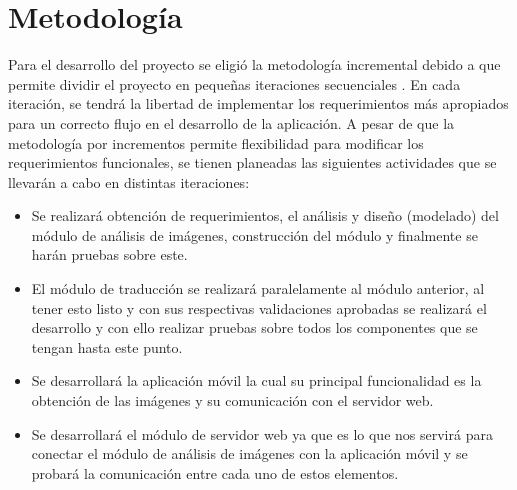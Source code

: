 \section{Metodología} Para el desarrollo del proyecto se eligió la metodología incremental debido a que permite dividir el proyecto en pequeñas iteraciones secuenciales \cite{iterativeDevelopment}. En cada iteración, se tendrá la libertad de implementar los requerimientos más apropiados para un correcto flujo en el desarrollo de la aplicación. A pesar de que la metodología por incrementos permite flexibilidad para modificar los requerimientos funcionales, se tienen planeadas las siguientes actividades que se llevarán a cabo en distintas iteraciones:
\bigskip
\begin{itemize}
    \item Se realizará obtención de requerimientos, el análisis y diseño (modelado) del módulo de análisis de imágenes, construcción del módulo y finalmente se harán pruebas sobre este.
    \item El módulo de traducción se realizará paralelamente al módulo anterior, al tener esto listo y con sus respectivas validaciones aprobadas se realizará el desarrollo y con ello realizar pruebas sobre todos los componentes que se tengan hasta este punto.
    \item Se desarrollará la aplicación móvil la cual su principal funcionalidad es la obtención de las imágenes y su comunicación con el servidor web.
    \item Se desarrollará el módulo de servidor web ya que es lo que nos servirá para conectar el módulo de análisis de imágenes con la aplicación móvil y se probará la comunicación entre cada uno de estos elementos.
\end{itemize}





\newpage






